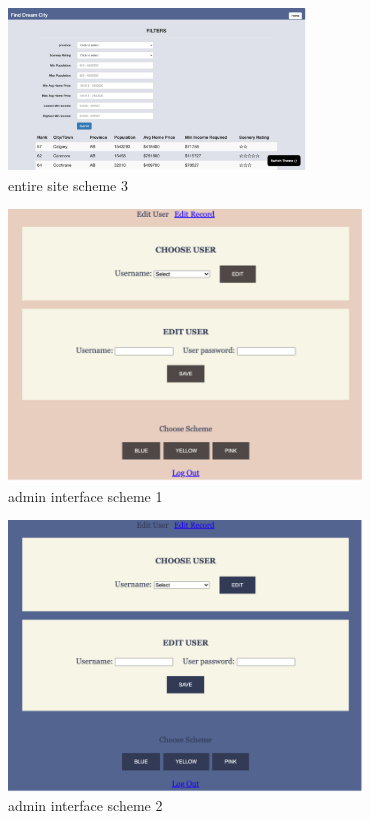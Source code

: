 \documentclass[12pt, letterpaper]{article}
\begin{document}
\begin{figure}[htbp]
	\centering
	\includegraphics[width=3.1in]{images/q14-3.png}
	\caption{entire site scheme 3}
 \end{figure}
 \newpage
 
 \begin{figure}[htbp]
	\centering
	\includegraphics[width=3.7in]{images/q14-4.png}
	\caption{admin interface scheme 1}
 \end{figure}
 
 \begin{figure}[htbp]
	\centering
	\includegraphics[width=3.7in]{images/q14-5.png}
	\caption{admin interface scheme 2}
 \end{figure}
 
\end{document}
